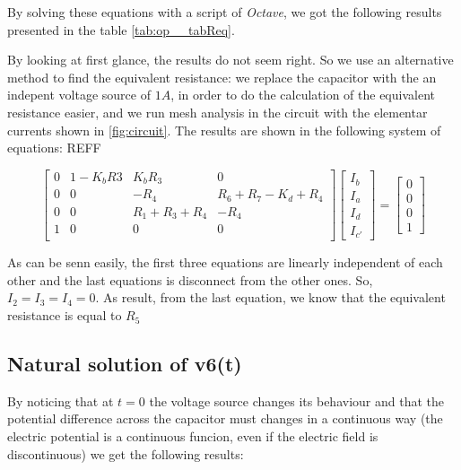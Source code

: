 By solving these equations with a script of \textit{Octave}, we got the following results presented in the table \ref{tab:op__tabReq}.


By looking at first glance, the results do not seem right. So we use an alternative method to find the equivalent resistance: we replace the capacitor with the an indepent voltage source of $1 A$, in order to do the calculation of the equivalent resistance easier,
and we run mesh analysis in the circuit with the elementar currents shown in \ref{fig:circuit}. The results are shown in the following system of equations: REFF

\[
  \begin{bmatrix}
    0 & 1-K_b R3 & K_b R_3         & 0                     \\
    0 & 0        & -R_4            & R_6 + R_7 - K_d + R_4 \\
    0 & 0        & R_1 + R_3 + R_4 & -R_4                  \\
    1 & 0        & 0               & 0                     \\
  \end{bmatrix}
  \begin{bmatrix}
    I_b \\ I_a \\ I_d \\ I_{c'}
  \end{bmatrix}
  =
  \begin{bmatrix}
    0 \\ 0 \\ 0 \\ 1
  \end{bmatrix}
\]

\hfill


As can be senn easily, the first three equations are linearly independent of each other and the last equations is disconnect from the other ones. So, $I_2 = I_3 = I_4 = 0$. As result, from the last equation, we know that
the equivalent resistance is equal to $R_5$




\subsection{Natural solution of v6(t)}

By noticing that at $t = 0$ the voltage source changes its behaviour and that the potential difference across the capacitor must changes in a continuous way (the electric potential is a continuous funcion, even  if the electric field is discontinuous)
we get the following results:

